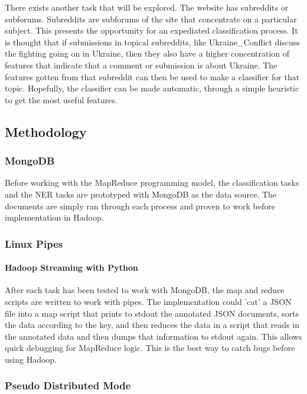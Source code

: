\documentclass[12pt,a4paper]{article}
\begin{document}
There exists another task that will be explored. The website has subreddits or
subforums. Subreddits are subforums of the site that concentrate on a particular
subject. This presents the opportunity for an expediated classification process.
It is thought that if submissions in topical subreddits, like Ukraine\_Conflict
discuss the fighting going on in Ukraine, then they also have a higher concentration
of features that indicate that a comment or submission is about Ukraine. 
The features gotten from that subreddit can then be used to make a classifier
for that topic. Hopefully, the classifier can be made automatic, through
a simple heuristic to get the most useful features.

\subsection{Methodology}

\subsubsection{MongoDB}

Before working with the MapReduce programming model, the classification
tasks and the NER tasks are prototyped with MongoDB as the data 
source. The documents are simply ran through each process and proven
to work before implementation in Hadoop.

\subsubsection{Linux Pipes}

\paragraph{Hadoop Streaming with Python} After each task has been tested to work with MongoDB, the map and reduce scripts are written to work with pipes. The
implementation could 'cat' a JSON file into a map script that prints to stdout
the annotated JSON documents, sorts the data according to the key, and then reduces the data in a script that reads in the annotated data and then dumps that information to stdout again. This allows quick debugging for MapReduce logic. This is the best
way to catch bugs before using Hadoop.

\subsubsection{Pseudo Distributed Mode}
\end{document}
